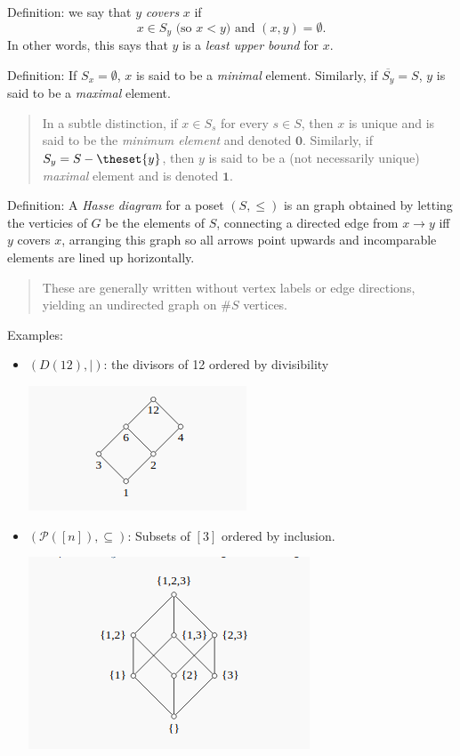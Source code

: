 Definition: we say that \(y\) \emph{covers} \(x\) if \[
x \in S_y \text{ (so $x < y$) and } (x,y) = \emptyset.
\] In other words, this says that \(y\) is a \emph{least upper bound}
for \(x\).

Definition: If \(S_x = \emptyset\), \(x\) is said to be a \emph{minimal}
element. Similarly, if \(\overline{S_y} = S\), \(y\) is said to be a
\emph{maximal} element.

\begin{quote}
In a subtle distinction, if \(x \in S_s\) for every \(s\in S\), then
\(x\) is unique and is said to be the \emph{minimum element} and denoted
\(\mathbf 0\). Similarly, if \(S_y = S-\theset{y}\), then \(y\) is said
to be a (not necessarily unique) \emph{maximal} element and is denoted
\(\mathbf 1\).
\end{quote}

Definition: A \emph{Hasse diagram} for a poset \((S, \leq)\) is an graph
obtained by letting the verticies of \(G\) be the elements of \(S\),
connecting a directed edge from \(x\to y\) iff \(y\) covers \(x\),
arranging this graph so all arrows point upwards and incomparable
elements are lined up horizontally.

\begin{quote}
These are generally written without vertex labels or edge directions,
yielding an undirected graph on \(\# S\) vertices.
\end{quote}

Examples:

\begin{itemize}
\item
  \((D(12), \mid)\): the divisors of 12 ordered by divisibility

  \includegraphics{2019-06-08-23-30-20.png}
\item
  \((\mathcal{P}([n]), \subseteq)\): Subsets of \([3]\) ordered by
  inclusion.

  \includegraphics{2019-06-08-23-29-44.png}
\end{itemize}

